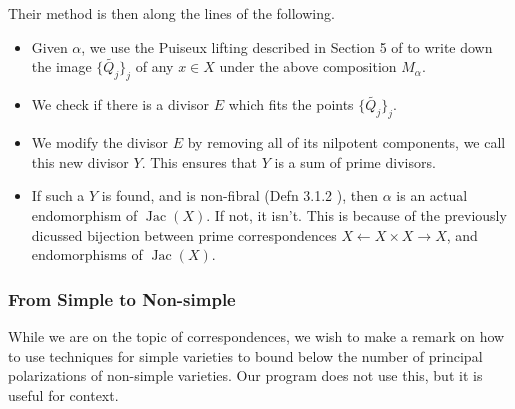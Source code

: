 \documentclass[12pt,reqno]{amsart}
\DeclareMathOperator{\Jac}{Jac}
\theoremstyle{definition}
\theoremstyle{remark}
\begin{document}
Their method is then along the lines of the following.
\begin{itemize}
\item Given $\alpha$, we use the Puiseux lifting described in Section 5 of \cite{rigor} to write down the image  $\{ \widetilde{Q_j} \}_j$ of any $x \in X$ under the above composition $M_\alpha$.
\item We check if there is a divisor $E$ which fits the points $\{ \widetilde{Q_j} \}_j$. 
\item We modify the divisor $E$ by removing all of its nilpotent components, we call this new divisor $Y$. This ensures that $Y$ is a sum of prime divisors. 
\item If such a $Y$ is found, and is non-fibral (Defn 3.1.2 \cite{smith}), then $\alpha$ is an actual endomorphism of $\Jac(X)$. If not, it isn't. This is because of the previously dicussed bijection between prime correspondences $X \leftarrow X \times X \to X$, and endomorphisms of $\Jac(X)$.
\end{itemize}

\subsubsection{From Simple to Non-simple}

While we are on the topic of correspondences, we wish to make a remark on how to use techniques for simple varieties to bound below the number of principal polarizations of non-simple varieties. Our program does not use this, but it is useful for context.
\end{document}
